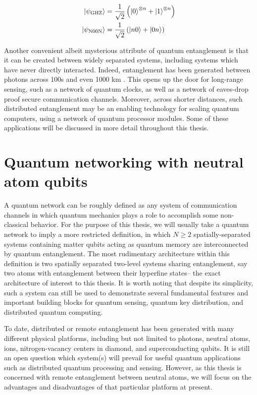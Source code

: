 \begin{align}
    \ket{\psi_{\text{GHZ}}} &= \frac{1}{\sqrt{2}} \left(\ket{0}^{\otimes n} + \ket{1}^{\otimes n}\right) \\
    \ket{\psi_{\text{N00N}}} &= \frac{1}{\sqrt{2}} \left( \ket{n0} + \ket{0n} \right)
\end{align}
    
Another convenient albeit mysterious attribute of quantum entanglement is that it can be created between widely separated systems, including systems which have never directly interacted. Indeed, entanglement has been generated between photons across 100s and even 1000 km \cite{Neumann2022, Yin2020}. This opens up the door for long-range sensing, such as a network of quantum clocks\cite{Kómár2014}, as well as a network of eaves-drop proof secure communication channels. Moreover, across shorter distances, such distributed entanglement may be an enabling technology for scaling quantum computers, using a network of quantum processor modules\cite{Monroe2014modular}. Some of these applications will be discussed in more detail throughout this thesis.

\section{Quantum networking with neutral atom qubits}

A quantum network can be roughly defined as any system of communication channels in which quantum mechanics plays a role to accomplish some non-classical behavior. For the purpose of this thesis, we will usually take a quantum network to imply a more restricted definition, in which $N\geq2$ spatially-separated systems containing matter qubits acting as quantum memory are interconnected by quantum entanglement. The most rudimentary architecture within this definition is two spatially separated two-level systems sharing entanglement, say two atoms with entanglement between their hyperfine states-- the exact architecture of interest to this thesis. It is worth noting that despite its simplicity, such a system can still be used to demonstrate several fundamental features and important building blocks for quantum sensing, quantum key distribution, and distributed quantum computing\cite{main2024, drmota2024, Langenfeld2021}.

To date, distributed or remote entanglement has been generated with many different physical platforms, including but not limited to photons, neutral atoms, ions, nitrogen-vacancy centers in diamond, and superconducting qubits. It is still an open question which system(s) will prevail for useful quantum applications such as distributed quantum processing and sensing. However, as this thesis is concerned with remote entanglement between neutral atoms, we will focus on the advantages and disadvantages of that particular platform at present.

